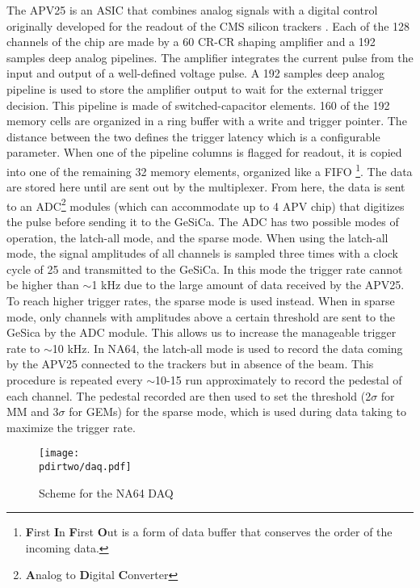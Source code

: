 The APV25 is an ASIC that combines analog signals with a digital control \cite{Bodlak_2013} originally developed for the readout of the CMS silicon trackers \cite{article,inproceedings,apv-useguide}. Each of the 128 channels of the chip are made by a 60 \nas CR-CR shaping amplifier and a 192 samples deep analog pipelines. The amplifier integrates the current pulse from the input and output of a well-defined voltage pulse. A 192 samples deep analog pipeline is used to store the amplifier output to wait for the external trigger decision. This pipeline is made of switched-capacitor elements. 160 of the 192 memory cells are organized in a ring buffer with a write and trigger pointer. The distance between the two defines the trigger latency which is a configurable parameter. When one of the pipeline columns is flagged for readout, it is copied into one of the remaining 32 memory elements, organized like a FIFO \footnote{\textbf{F}irst \textbf{I}n \textbf{F}irst \textbf{O}ut is a form of data buffer that conserves the order of the incoming data.}. The data are stored here until are sent out by the multiplexer. From here, the data is sent to an ADC\footnote{\textbf{A}nalog to \textbf{D}igital \textbf{C}onverter} modules (which can accommodate up to 4 APV chip) that digitizes the pulse before sending it to the GeSiCa. The ADC has two possible modes of operation, the latch-all mode, and the sparse mode. When using the latch-all mode, the signal amplitudes of all channels is sampled three times with a clock cycle of 25 \nas and transmitted to the GeSiCa. In this mode the trigger rate cannot be higher than $\sim$1 \si{\kilo\hertz} due to the large amount of data received by the APV25. To reach higher trigger rates, the sparse mode is used instead. When in sparse mode, only channels with amplitudes above a certain threshold are sent to the GeSica by the ADC module. This allows us to increase the manageable trigger rate to $\sim$10 \si{\kilo\hertz}. In NA64, the latch-all mode is used to record the data coming by the APV25 connected to the trackers but in absence of the beam. This procedure is repeated every $\sim$10-15 run approximately to record the pedestal of each channel. The pedestal recorded are then used to set the threshold (2$\sigma$ for MM and 3$\sigma$ for GEMs) for the sparse mode, which is used during data taking to maximize the trigger rate.

\begin{figure}[tbh!]
\centering
\texttt{[image: \\pdirtwo/daq.pdf]}
\caption{Scheme for the NA64 DAQ}
\label{fig:daq}
\end{figure}

